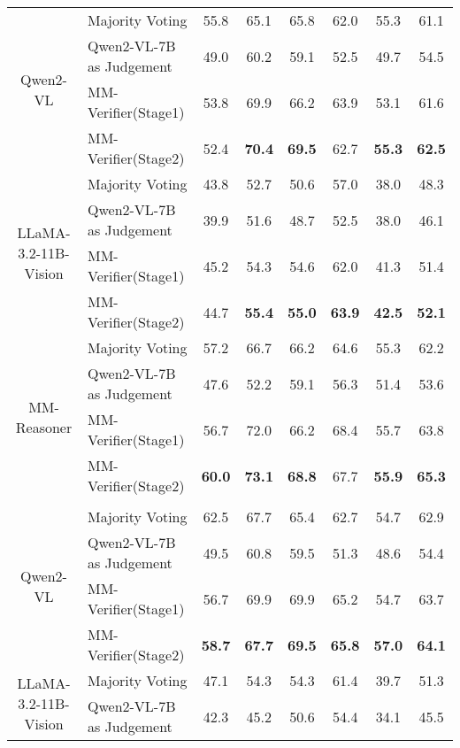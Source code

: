 \begin{table*}[htbp]
{\begin{tabular}{cl|c|c|c|c|c|c}
    \midrule
    \multirow{4}[2]{*}{Qwen2-VL} & Majority Voting & 55.8  & 65.1  & 65.8  & 62.0  & 55.3  & 61.1 \\
          & Qwen2-VL-7B as Judgement & 49.0  & 60.2  & 59.1  & 52.5  & 49.7  & 54.5 \\
          & MM-Verifier(Stage1) & 53.8  & 69.9  & 66.2  & 63.9  & 53.1  & 61.6 \\
          & MM-Verifier(Stage2) & 52.4  & \textbf{70.4}  & \textbf{69.5}  & 62.7  & \textbf{55.3}  & \textbf{62.5} \\
    \midrule
    \multirow{4}[1]{*}{LLaMA-3.2-11B-Vision} & Majority Voting & 43.8  & 52.7  & 50.6  & 57.0  & 38.0  & 48.3 \\
          & Qwen2-VL-7B as Judgement & 39.9  & 51.6  & 48.7  & 52.5  & 38.0  & 46.1 \\
          & MM-Verifier(Stage1) & 45.2  & 54.3  & 54.6  & 62.0  & 41.3  & 51.4 \\
          & MM-Verifier(Stage2) & 44.7  & \textbf{55.4}  & \textbf{55.0}  & \textbf{63.9}  & \textbf{42.5}  & \textbf{52.1} \\
    \midrule
    \multirow{4}[1]{*}{MM-Reasoner} & Majority Voting & 57.2  & 66.7  & 66.2  & 64.6  & 55.3  & 62.2 \\
          & Qwen2-VL-7B as Judgement & 47.6  & 52.2  & 59.1  & 56.3  & 51.4  & 53.6 \\
          & MM-Verifier(Stage1) & 56.7  & 72.0  & 66.2  & 68.4  & 55.7  & 63.8 \\
          & MM-Verifier(Stage2) & \textbf{60.0}  & \textbf{73.1}  & \textbf{68.8}  & 67.7  & \textbf{55.9}  & \textbf{65.3} \\
    \midrule
    \rowcolor[rgb]{ .851,  .882,  .949} \multicolumn{8}{c}{\textit{Sample 12}} \\
    \midrule
    \multirow{4}[2]{*}{Qwen2-VL} & Majority Voting & 62.5  & 67.7  & 65.4  & 62.7  & 54.7  & 62.9 \\
          & Qwen2-VL-7B as Judgement & 49.5  & 60.8  & 59.5  & 51.3  & 48.6  & 54.4 \\
          & MM-Verifier(Stage1) & 56.7  & 69.9  & 69.9  & 65.2  & 54.7  & 63.7 \\
          & MM-Verifier(Stage2) & \textbf{58.7}  & \textbf{67.7}  & \textbf{69.5}  & \textbf{65.8}  & \textbf{57.0}  & \textbf{64.1} \\
    \midrule
    \multirow{4}[2]{*}{LLaMA-3.2-11B-Vision} & Majority Voting & 47.1  & 54.3  & 54.3  & 61.4  & 39.7  & 51.3 \\
          & Qwen2-VL-7B as Judgement & 42.3  & 45.2  & 50.6  & 54.4  & 34.1  & 45.5 \\

\end{tabular}}
\end{table*}
